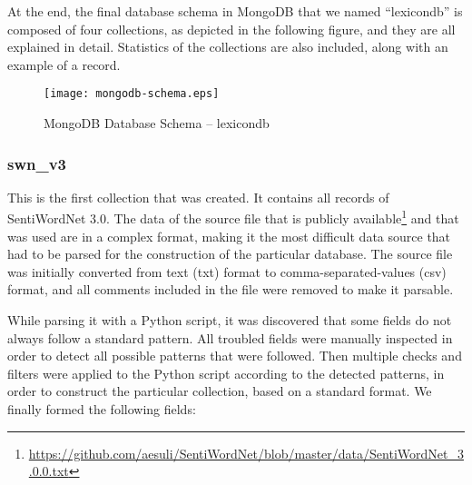At the end, the final database schema in MongoDB
that we named ``lexicondb''
is composed of four collections,
as depicted in the following figure,
and they are all explained in detail.
Statistics of the collections are also included,
along with an example of a record.

\begin{figure}[ht]
\centering
\texttt{[image: mongodb-schema.eps]}
\caption{MongoDB Database Schema -- lexicondb}
\label{fig:mongodb-schema}
\end{figure}

\clearpage

\subsubsection{swn\_v3}
\label{subsubsec:swn-v3}

This is the first collection that was created.
It contains all records of SentiWordNet 3.0.
The data of the source file that is publicly available\footnote{\url {https://github.com/aesuli/SentiWordNet/blob/master/data/SentiWordNet_3.0.0.txt}}
and that was used are in a complex format,
making it the most difficult data source that had to be parsed
for the construction of the particular database.
The source file was initially converted
from text (txt) format to comma-separated-values (csv) format,
and all comments included in the file were removed
to make it parsable.

While parsing it with a Python script, it was discovered that
some fields do not always follow a standard pattern.
All troubled fields were manually inspected
in order to detect all possible patterns that were followed.
Then multiple checks and filters were applied to the Python script 
according to the detected patterns,
in order to construct the particular collection,
based on a standard format.
We finally formed the following fields:

